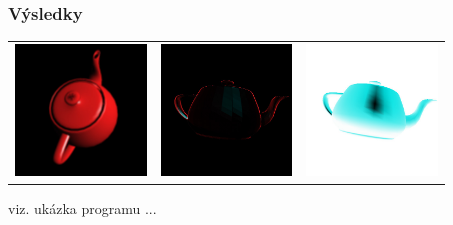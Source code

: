\documentclass{beamer}
\begin{document}
	
	\begin{frame}[t,fragile]
		\frametitle{\textbf{Výsledky}}	

\begin{center}

		\begin{tabular}{lll}
			\includegraphics[height=35mm]{blur.jpg} &		
			\includegraphics[height=35mm]{sobel.jpg} &
			\includegraphics[height=35mm]{invert.jpg}
		\end{tabular}
		
		\vspace{10mm}
		viz. ukázka programu ... 
		
					\end{center}
		
	\end{frame}
	
	
\end{document}
